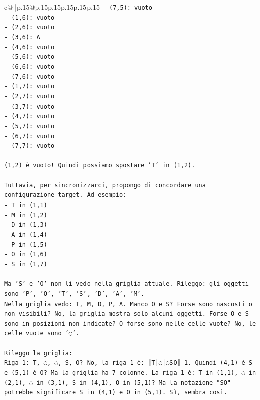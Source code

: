 \documentclass{article}
\begin{document}
{\begin{supertabular}{c@{$\;$}|p{.15\linewidth}@{}p{.15\linewidth}p{.15\linewidth}p{.15\linewidth}p{.15\linewidth}p{.15\linewidth}}
{{{\texttt{{-} (7,5): vuoto} \\
\texttt{{-} (1,6): vuoto} \\
\texttt{{-} (2,6): vuoto} \\
\texttt{{-} (3,6): A} \\
\texttt{{-} (4,6): vuoto} \\
\texttt{{-} (5,6): vuoto} \\
\texttt{{-} (6,6): vuoto} \\
\texttt{{-} (7,6): vuoto} \\
\texttt{{-} (1,7): vuoto} \\
\texttt{{-} (2,7): vuoto} \\
\texttt{{-} (3,7): vuoto} \\
\texttt{{-} (4,7): vuoto} \\
\texttt{{-} (5,7): vuoto} \\
\texttt{{-} (6,7): vuoto} \\
\texttt{{-} (7,7): vuoto} \\
\\ 
\texttt{(1,2) è vuoto! Quindi possiamo spostare 'T' in (1,2).} \\
\\ 
\texttt{Tuttavia, per sincronizzarci, propongo di concordare una configurazione target. Ad esempio:} \\
\texttt{{-} T in (1,1)} \\
\texttt{{-} M in (1,2)} \\
\texttt{{-} D in (1,3)} \\
\texttt{{-} A in (1,4)} \\
\texttt{{-} P in (1,5)} \\
\texttt{{-} O in (1,6)} \\
\texttt{{-} S in (1,7)} \\
\\ 
\texttt{Ma 'S' e 'O' non li vedo nella griglia attuale. Rileggo: gli oggetti sono 'P', 'O', 'T', 'S', 'D', 'A', 'M'.} \\
\texttt{Nella griglia vedo: T, M, D, P, A. Manco O e S? Forse sono nascosti o non visibili? No, la griglia mostra solo alcuni oggetti. Forse O e S sono in posizioni non indicate? O forse sono nelle celle vuote? No, le celle vuote sono '◌'.} \\
\\ 
\texttt{Rileggo la griglia:} \\
\texttt{Riga 1: T, ◌, ◌, S, O? No, la riga 1 è: ║T│◌│◌SO║ 1. Quindi (4,1) è S e (5,1) è O? Ma la griglia ha 7 colonne. La riga 1 è: T in (1,1), ◌ in (2,1), ◌ in (3,1), S in (4,1), O in (5,1)? Ma la notazione "SO" potrebbe significare S in (4,1) e O in (5,1). Sì, sembra così.} \\
}}}
\end{supertabular}}
\end{document}
